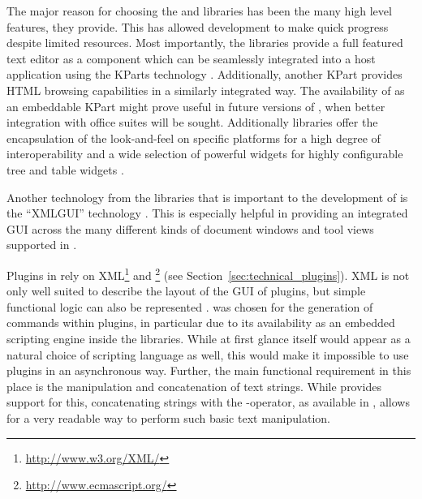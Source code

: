 The major reason for choosing the  and  libraries has been the 
many high level features, they provide. This has allowed  development to make quick
progress despite limited resources. Most importantly, the  libraries provide a
full featured text editor \citep{CullmannND} as a component which can be
seamlessly integrated into a host application using the KParts technology
\citep{Faure2000}. Additionally, another KPart provides HTML browsing capabilities in a
similarly integrated way. The availability of  \citep{KWord} as an
embeddable KPart might prove useful in future versions of , when better
integration with office suites will be sought. Additionally  libraries offer 
the encapsulation of the look-and-feel on specific platforms for a high degree of interoperability 
and a wide selection of powerful widgets for highly configurable tree and table widgets \citep{Raaphorst2003}.

Another technology from the  libraries that is important to the development
of  is the ``XMLGUI'' technology
\citep{Faure2000}. This is especially helpful in providing an integrated GUI across
the many different kinds of document windows and tool views supported in .

Plugins in  rely on XML\footnote{\url{http://www.w3.org/XML/}}
and \footnote{\url{http://www.ecmascript.org/}} (see Section~\ref{sec:technical_plugins}). XML is not
only well suited to describe the layout of the GUI of plugins, but simple
functional logic can also be represented \citep[see also][]{Visne2009}.  was
chosen for the generation of  commands within plugins, in particular due to its
availability as an embedded scripting engine inside the  libraries. While at
first glance  itself would appear as a natural choice of scripting language as
well, this would make it impossible to use plugins in an asynchronous way.
Further, the main functional requirement in this place is the manipulation and
concatenation of text strings. While  provides support for this, concatenating
strings with the \code{+}-operator, as available in , allows for a
very readable way to perform such basic text manipulation.

